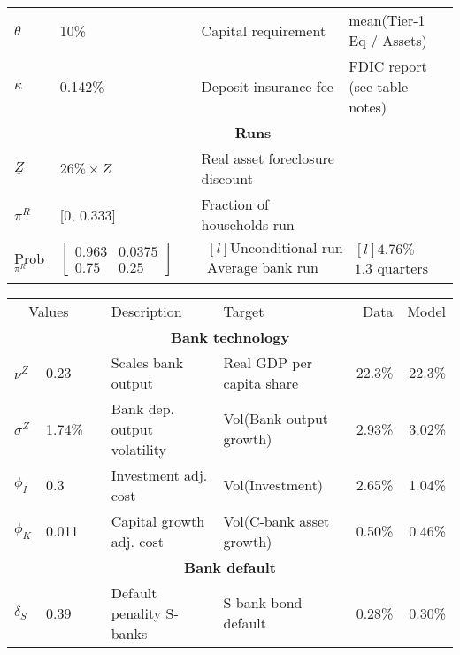 \documentclass[letterpaper,12pt,dvipsnames,usenames]{article}
\theoremstyle{plain}
\begin{document}
\begin{table}[!ht]
{\begin{threeparttable}
\begin{tabular}{lllll}
				$\theta$ & 10\%   &             & Capital requirement   & mean(Tier-1 Eq /   Assets)\\
				$\kappa$ & 0.142\% &        & Deposit insurance fee    & FDIC report  (see table notes)\\
				\midrule
				& \multicolumn{4}{c}{\textbf{Runs }}             \\
				$\underline{Z} $ & $26\% \times Z$ &       & Real asset foreclosure discount &  \citet{campbell2011forced}   \\
				$\pi^R$ & [0, 0.333]     &    & Fraction of households run &  \cite{covitz2013evolution}    \\
				Prob$_{\pi^R}$ & $\begin{bmatrix}
					0.963 & 0.0375\\
					0.75 & 0.25
				\end{bmatrix}$ &  & $\begin{matrix*}[l]
					\text{Unconditional run probability} \\
					\text{Average bank run length}
				\end{matrix*}$   &  $\begin{matrix*}[l]
					4.76\% \\
					1.3 \text{ quarters}
				\end{matrix*}$          \\ 
				\bottomrule
			\end{tabular}
			\begin{tabular}{lllllrr}
				\toprule
				\multicolumn{2}{c}{Values } & & Description   & Target & Data  & Model \\
				\multicolumn{7}{c}{\textbf{Bank technology}} \\              
				$\nu^Z$   & 0.23 &   &  Scales bank output  & Real GDP per capita  share &  22.3\% &  22.3\%  \\
				$\sigma^Z$  & 1.74\% &       & Bank dep. output volatility  & Vol(Bank output growth)  & 2.93\% & 3.02\% \\ 
				$\phi_I$ & 0.3   &          & Investment adj. cost & Vol(Investment) & 2.65\% & 1.04\% \\ 
				$\phi_K$ & 0.011      &      & Capital growth adj. cost & Vol(C-bank asset growth) & 0.50\% & 0.46\% \\ 
				\midrule
				\multicolumn{7}{c}{\textbf{Bank default}} \\                  
				$\delta_S$ & 0.39   &    &  Default penality S-banks &  S-bank bond default & 0.28\% & 0.30\%  \\

\end{tabular}
\end{threeparttable}}
\end{table}
\end{document}

